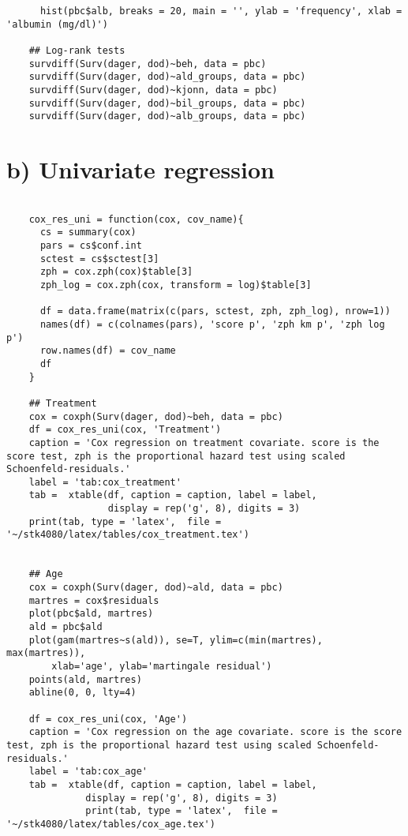\documentclass[11pt,a4paper]{article}
\begin{document}
\begin{appendices}
\begin{verbatim}
      hist(pbc$alb, breaks = 20, main = '', ylab = 'frequency', xlab = 'albumin (mg/dl)')

    ## Log-rank tests
    survdiff(Surv(dager, dod)~beh, data = pbc)
    survdiff(Surv(dager, dod)~ald_groups, data = pbc)
    survdiff(Surv(dager, dod)~kjonn, data = pbc)
    survdiff(Surv(dager, dod)~bil_groups, data = pbc)
    survdiff(Surv(dager, dod)~alb_groups, data = pbc)

    \end{verbatim}





    \section{b) Univariate regression}
    \begin{verbatim}

    cox_res_uni = function(cox, cov_name){
      cs = summary(cox)
      pars = cs$conf.int
      sctest = cs$sctest[3]
      zph = cox.zph(cox)$table[3]
      zph_log = cox.zph(cox, transform = log)$table[3]
               
      df = data.frame(matrix(c(pars, sctest, zph, zph_log), nrow=1))
      names(df) = c(colnames(pars), 'score p', 'zph km p', 'zph log p')
      row.names(df) = cov_name
      df
    }

    ## Treatment
    cox = coxph(Surv(dager, dod)~beh, data = pbc)
    df = cox_res_uni(cox, 'Treatment')
    caption = 'Cox regression on treatment covariate. score is the score test, zph is the proportional hazard test using scaled Schoenfeld-residuals.'
    label = 'tab:cox_treatment'
    tab =  xtable(df, caption = caption, label = label, 
                  display = rep('g', 8), digits = 3)
    print(tab, type = 'latex',  file = '~/stk4080/latex/tables/cox_treatment.tex')


    ## Age
    cox = coxph(Surv(dager, dod)~ald, data = pbc)
    martres = cox$residuals
    plot(pbc$ald, martres)
    ald = pbc$ald
    plot(gam(martres~s(ald)), se=T, ylim=c(min(martres), max(martres)), 
        xlab='age', ylab='martingale residual')
    points(ald, martres)
    abline(0, 0, lty=4)

    df = cox_res_uni(cox, 'Age')
    caption = 'Cox regression on the age covariate. score is the score test, zph is the proportional hazard test using scaled Schoenfeld-residuals.'
    label = 'tab:cox_age'
    tab =  xtable(df, caption = caption, label = label, 
              display = rep('g', 8), digits = 3)
              print(tab, type = 'latex',  file = '~/stk4080/latex/tables/cox_age.tex')



\end{verbatim}
\end{appendices}
\end{document}
